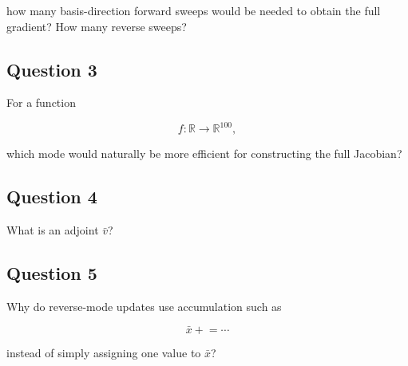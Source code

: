\documentclass{course_sheet}
\begin{document}
how many basis-direction forward sweeps would be needed to obtain the full gradient? How many reverse sweeps?

\subsection*{Question 3}
For a function

\[
f:\mathbb R\to\mathbb R^{100},
\]

which mode would naturally be more efficient for constructing the full Jacobian?

\subsection*{Question 4}
What is an adjoint $\bar v$?

\subsection*{Question 5}
Why do reverse-mode updates use accumulation such as

\[
\bar x\mathrel{+}=\cdots
\]

instead of simply assigning one value to $\bar x$?
\end{document}
